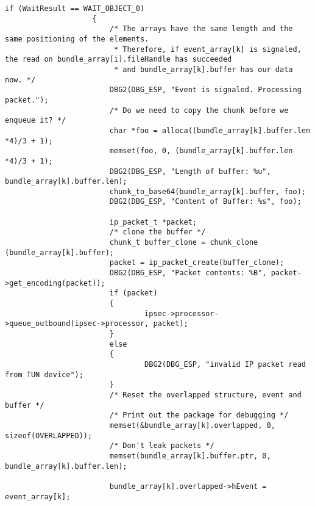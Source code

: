 \begin{lstlisting}[caption=Code für handle\_plain auf Windows,label=lst:handle-plain-windows]
                    if (WaitResult == WAIT_OBJECT_0)
                    {
                        /* The arrays have the same length and the same positioning of the elements.
                         * Therefore, if event_array[k] is signaled, the read on bundle_array[i].fileHandle has succeeded
                         * and bundle_array[k].buffer has our data now. */
                        DBG2(DBG_ESP, "Event is signaled. Processing packet.");
                        /* Do we need to copy the chunk before we enqueue it? */
                        char *foo = alloca((bundle_array[k].buffer.len *4)/3 + 1);
                        memset(foo, 0, (bundle_array[k].buffer.len *4)/3 + 1);
                        DBG2(DBG_ESP, "Length of buffer: %u", bundle_array[k].buffer.len);
                        chunk_to_base64(bundle_array[k].buffer, foo);
                        DBG2(DBG_ESP, "Content of Buffer: %s", foo);

                        ip_packet_t *packet;
                        /* clone the buffer */
                        chunk_t buffer_clone = chunk_clone (bundle_array[k].buffer);
                        packet = ip_packet_create(buffer_clone);
                        DBG2(DBG_ESP, "Packet contents: %B", packet->get_encoding(packet));
                        if (packet)
                        {
                                ipsec->processor->queue_outbound(ipsec->processor, packet);
                        }
                        else
                        {
                                DBG2(DBG_ESP, "invalid IP packet read from TUN device");
                        }
                        /* Reset the overlapped structure, event and buffer */
                        /* Print out the package for debugging */
                        memset(&bundle_array[k].overlapped, 0, sizeof(OVERLAPPED));
                        /* Don't leak packets */
                        memset(bundle_array[k].buffer.ptr, 0, bundle_array[k].buffer.len);

                        bundle_array[k].overlapped->hEvent = event_array[k];


\end{lstlisting}
